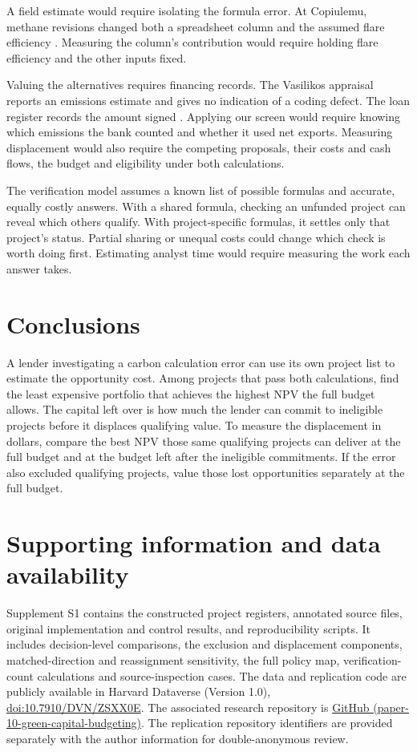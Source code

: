 A field estimate would require isolating the formula error. At Copiulemu, methane revisions changed both a spreadsheet column and the assumed flare efficiency \citep[pp.~9--11, 14]{sgs}. Measuring the column's contribution would require holding flare efficiency and the other inputs fixed.

Valuing the alternatives requires financing records. The Vasilikos appraisal reports an emissions estimate and gives no indication of a coding defect. The loan register records the amount signed \citep{eibscore,eibloan}. Applying our screen would require knowing which emissions the bank counted and whether it used net exports. Measuring displacement would also require the competing proposals, their costs and cash flows, the budget and eligibility under both calculations.

The verification model assumes a known list of possible formulas and accurate, equally costly answers. With a shared formula, checking an unfunded project can reveal which others qualify. With project-specific formulas, it settles only that project's status. Partial sharing or unequal costs could change which check is worth doing first. Estimating analyst time would require measuring the work each answer takes.

\section{Conclusions}
A lender investigating a carbon calculation error can use its own project list to estimate the opportunity cost. Among projects that pass both calculations, find the least expensive portfolio that achieves the highest NPV the full budget allows. The capital left over is how much the lender can commit to ineligible projects before it displaces qualifying value. To measure the displacement in dollars, compare the best NPV those same qualifying projects can deliver at the full budget and at the budget left after the ineligible commitments. If the error also excluded qualifying projects, value those lost opportunities separately at the full budget.

\section*{Supporting information and data availability}
Supplement S1 contains the constructed project registers, annotated source files, original implementation and control results, and reproducibility scripts. It includes decision-level comparisons, the exclusion and displacement components, matched-direction and reassignment sensitivity, the full policy map, verification-count calculations and source-inspection cases. \ifdefined\readingcopy
The data and replication code are publicly available in Harvard Dataverse (Version 1.0), \href{https://doi.org/10.7910/DVN/ZSXX0E}{doi:10.7910/DVN/ZSXX0E}. The associated research repository is \href{https://github.com/Meshaal-Mouawad/paper-10-green-capital-budgeting}{GitHub (paper-10-green-capital-budgeting)}.
\else
The replication repository identifiers are provided separately with the author information for double-anonymous review.
\fi
